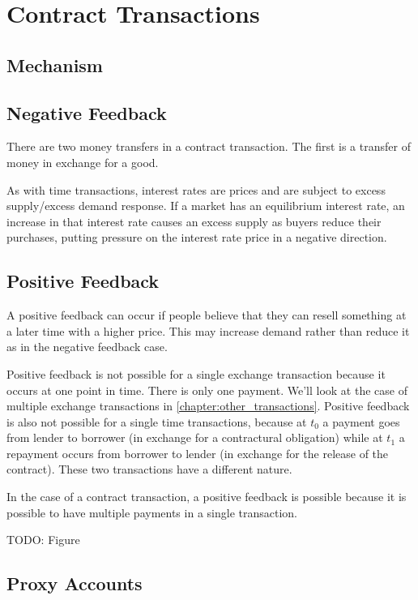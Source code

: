 \chapter{Contract Transactions}
\label{chapter:contract_transactions}

\section{Mechanism}

\section{Negative Feedback}

There are two money transfers in a contract transaction. The first is a transfer of money in
exchange for a good.

As with time transactions, interest rates are prices and are subject to excess supply/excess demand
response. If a market has an equilibrium interest rate, an increase in that interest rate causes an
excess supply as buyers reduce their purchases, putting pressure on the interest rate price in a
negative direction. 

\section{Positive Feedback}

A positive feedback can occur if people believe that they can resell something at a later time with
a higher price. This may increase demand rather than reduce it as in the negative feedback case.

Positive feedback is not possible for a single exchange transaction because it occurs at one point
in time. There is only one payment. We'll look at the case of multiple exchange transactions in
\ref{chapter:other_transactions}. Positive feedback is also not possible for a single time
transactions, because at \(t_0\) a payment goes from lender to borrower (in exchange for a
contractural obligation) while at \(t_1\) a repayment occurs from borrower to lender (in exchange
for the release of the contract). These two transactions have a different nature. 

In the case of a contract transaction, a positive feedback is possible because it is possible to
have multiple payments in a single transaction.

TODO: Figure

\section{Proxy Accounts}

